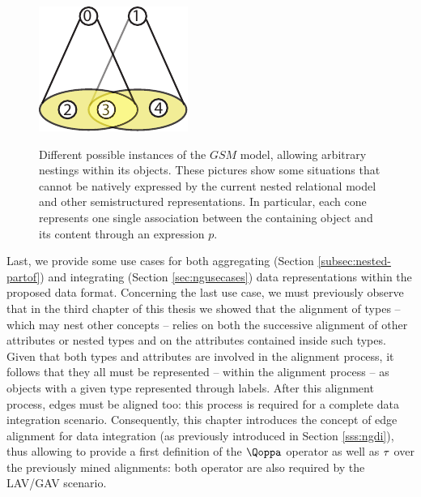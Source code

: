 \begin{figure}
	\begin{minipage}{.45\textwidth}
		\centering
		\includegraphics{fig/04model/03Overlapping}
		\label{fig:03overlapping}
	\end{minipage}
	\caption{Different possible instances of the $GSM$ model, allowing arbitrary nestings within its objects. These pictures show some situations that cannot be natively expressed by the current nested relational model and other semistructured representations. In particular, each cone represents one single association between the containing object and its content through an expression $p$.}
\end{figure}
Last, we provide some use cases for both aggregating (Section \ref{subsec:nested-partof}) and integrating (Section \ref{sec:ngusecases}) data representations within the proposed data format. Concerning the last use case, we must previously observe that in the third chapter of this thesis we  showed that the alignment of types -- which may nest other concepts -- relies on both the successive alignment of other attributes or nested types and on the attributes contained inside such types. Given that both types and attributes are involved in the alignment process, it follows that they all must be represented -- within the alignment process -- as objects with a given type represented through labels. 
After this alignment process, edges must be aligned too: this process is required for a complete data integration scenario. Consequently, this chapter introduces the concept of edge alignment for data integration (as previously introduced in Section \vref{sss:ngdi}), thus allowing to provide a first definition of the $\qtransl$ operator as well as $\ttransl$ over the previously mined alignments: both operator are also required by the LAV/GAV scenario.


